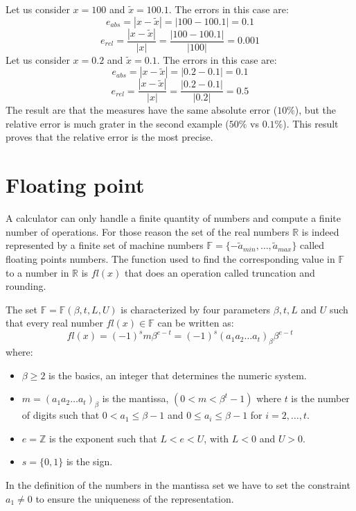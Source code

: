 \documentclass[12pt, a4paper]{report}
\newtheorem[style=M,bodystyle=\normalfont]{theorem}{Theorem}
\newtheorem[style=M,bodystyle=\normalfont]{corollary}{Corollary}
\newtheorem[style=M,bodystyle=\normalfont]{lemma}{Lemma}
\newtheorem[style=M,bodystyle=\normalfont]{definition}{Definition}
\begin{document}
\begin{example}
    Let us consider $x=100$ and $\tilde{x}=100.1$. The errors in this case are: 
    \[e_{abs}=\left\lvert x - \tilde{x} \right\rvert=\left\lvert 100 - 100.1 \right\rvert=0.1\]
    \[e_{rel}=\dfrac{\left\lvert x - \tilde{x} \right\rvert}{\left\lvert x \right\rvert}=\dfrac{\left\lvert 100 - 100.1 \right\rvert}{\left\lvert 100 \right\rvert}=0.001\]
    Let us consider $x=0.2$ and $\tilde{x}=0.1$. The errors in this case are: 
    \[e_{abs}=\left\lvert x - \tilde{x} \right\rvert=\left\lvert 0.2 - 0.1 \right\rvert=0.1\]
    \[e_{rel}=\dfrac{\left\lvert x - \tilde{x} \right\rvert}{\left\lvert x \right\rvert}=\dfrac{\left\lvert 0.2 - 0.1 \right\rvert}{\left\lvert 0.2 \right\rvert}=0.5\]
    The result are that the measures have the same absolute error ($10\%$), but the relative error is much grater in the second example ($50\%$ vs $0.1\%$).
    This result proves that the relative error is the most precise.
\end{example}

\section{Floating point}
A calculator can only handle a finite quantity of numbers and compute a finite number of operations. For those reason the set of the real numbers 
$\mathbb{R}$ is indeed represented by a finite set of machine numbers $\mathbb{F}=\{-\tilde{a}_{min}, \dots , \tilde{a}_{max} \}$ called
floating points numbers. The function used to find the corresponding value in $\mathbb{F}$ to a number in $\mathbb{R}$ is $fl(x)$ that does an 
operation called truncation and rounding.

The set $\mathbb{F}=\mathbb{F}(\beta,t,L,U)$ is characterized by four parameters $\beta,t,L$ and $U$ such that every real number $fl(x) \in \mathbb{F}$ 
can be written as:
\[fl(x)=(-1)^sm\beta^{e-t}=(-1)^s(a_1a_2\dots a_t)_{\beta}\beta^{e-t}\]
where:
\begin{itemize}
    \item $\beta \geq 2$ is the basics, an integer that determines the numeric system. 
    \item $m=(a_1a_2\dots a_t)_{\beta}$ is the mantissa, $(0<m<\beta^t-1)$ where $t$ is the number of digits such that $0<a_1 \leq \beta - 1$
        and $0 \leq a_i \leq \beta - 1$ for $i=2, \dots, t$. 
    \item $e=\mathbb{Z}$ is the exponent such that $L<e<U$, with $L<0$ and $U>0$. 
    \item $s=\{0,1\}$ is the sign. 
\end{itemize}
In the definition of the numbers in the mantissa set we have to set the constraint $a_1 \neq 0$ to ensure the uniqueness of the representation. 
\end{document}

